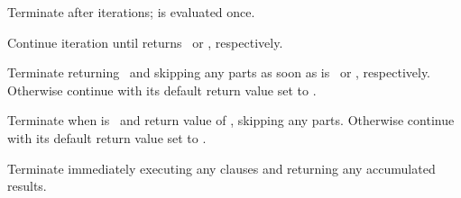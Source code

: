 \begin{LIST}{1cm}
\begin{LIST}{.5cm}
    {
      Terminate  after  iterations;  is
      evaluated once.
    }

    {
      Continue iteration until  returns \NIL\ or \T,
      respectively.
    }

    {
      Terminate  returning \NIL\ and skipping any
       parts as soon as  is \NIL\ or \T,
      respectively. Otherwise continue  with its default
      return value set to \T.
    }

    {
      Terminate  when  is \T\ and return value of
      , skipping any  parts. Otherwise
      continue  with its default return value set to \NIL.
    }

    {
      Terminate  immediately executing any 
      clauses and returning any accumulated results.
    }
  \end{LIST}
\end{LIST}





